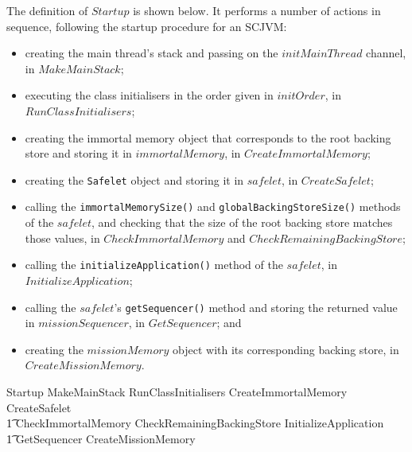The definition of $Startup$ is shown below.
It performs a number of actions in sequence, following the startup procedure for an SCJVM:
\begin{itemize}
\item creating the main thread's stack and passing on the
  $initMainThread$ channel, in $MakeMainStack$;
\item executing the class initialisers in the order given in
  $initOrder$, in $RunClassInitialisers$;
\item creating the immortal memory object that corresponds to the root
  backing store and storing it in $immortalMemory$, in
  $CreateImmortalMemory$;
\item creating the \texttt{Safelet} object and storing it in
  $safelet$, in $CreateSafelet$;
\item calling the \texttt{immortalMemorySize()} and
  \texttt{globalBackingStoreSize()} methods of the $safelet$, and
  checking that the size of the root backing store matches those
  values, in $CheckImmortalMemory$ and $CheckRemainingBackingStore$;
\item calling the \texttt{initializeApplication()} method of the $safelet$, in $InitializeApplication$;
\item calling the $safelet$'s \texttt{getSequencer()} method and
  storing the returned value in $missionSequencer$, in $GetSequencer$;
  and
\item creating the $missionMemory$ object with its corresponding backing store, in $CreateMissionMemory$.
\end{itemize}
\begin{circusaction}
  Startup \circdef MakeMainStack \circseq RunClassInitialisers \circseq CreateImmortalMemory \circseq CreateSafelet \circseq \\
  \t1 CheckImmortalMemory \circseq CheckRemainingBackingStore \circseq InitializeApplication \circseq \\
  \t1 GetSequencer \circseq CreateMissionMemory
\end{circusaction}

